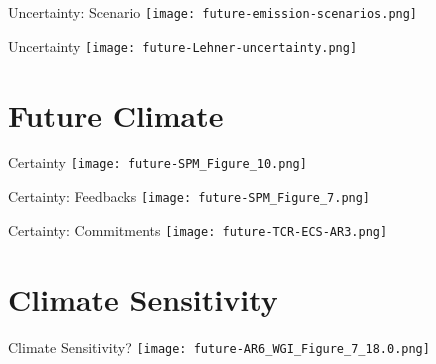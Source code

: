 \begin{frame}{Uncertainty: Scenario}
    \centering
    \texttt{[image: future-emission-scenarios.png]}
\end{frame}

\begin{frame}{Uncertainty}
    \centering
    \texttt{[image: future-Lehner-uncertainty.png]}


\end{frame}

\section{Future Climate}

\begin{frame}{Certainty}
    \centering
    \texttt{[image: future-SPM\_Figure\_10.png]}
\end{frame}

\begin{frame}{Certainty: Feedbacks}
    \centering
    \texttt{[image: future-SPM\_Figure\_7.png]}
\end{frame}

\begin{frame}{Certainty: Commitments}
    \centering
    \texttt{[image: future-TCR-ECS-AR3.png]}
\end{frame}

\section{Climate Sensitivity}

\begin{frame}{Climate Sensitivity?}
    \centering
    \texttt{[image: future-AR6\_WGI\_Figure\_7\_18.0.png]}
\end{frame}


